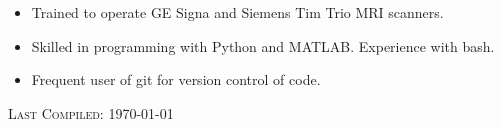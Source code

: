 \documentclass[10pt]{article}
\newenvironment{bottompar}{\par\vspace*{\fill}}{\clearpage}
\newcommand{\headstyle}{\scshape \normalsize \textcolor{light-gray}}
\begin{document}
\begin{itemize}[noitemsep, nolistsep, leftmargin=*]
\item
  Trained to operate GE Signa and Siemens Tim Trio MRI scanners.
\item
  Skilled in programming with Python and MATLAB. Experience with bash.
\item
  Frequent user of git for version control of code.
\end{itemize}

\begin{bottompar}
	\begin{center}
		\headstyle{Last Compiled: \today}
	\end{center}
\end{bottompar}
\end{document}
